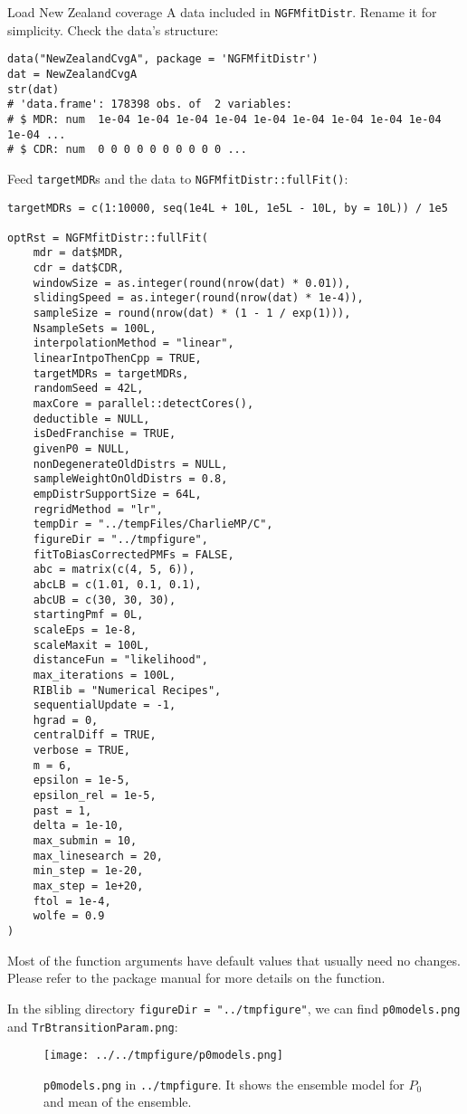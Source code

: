 \documentclass[12pt,letterpaper]{article}
\begin{document}
Load New Zealand coverage A data included in \texttt{NGFMfitDistr}. Rename it for simplicity. Check the data's structure:
\begin{verbatim}
data("NewZealandCvgA", package = 'NGFMfitDistr')
dat = NewZealandCvgA
str(dat)
# 'data.frame':	178398 obs. of  2 variables:
# $ MDR: num  1e-04 1e-04 1e-04 1e-04 1e-04 1e-04 1e-04 1e-04 1e-04 1e-04 ...
# $ CDR: num  0 0 0 0 0 0 0 0 0 0 ...
\end{verbatim}
Feed \texttt{targetMDR}s and the data to \texttt{NGFMfitDistr::fullFit()}:
\begin{verbatim}
targetMDRs = c(1:10000, seq(1e4L + 10L, 1e5L - 10L, by = 10L)) / 1e5

optRst = NGFMfitDistr::fullFit(
	mdr = dat$MDR,
	cdr = dat$CDR,
	windowSize = as.integer(round(nrow(dat) * 0.01)),
	slidingSpeed = as.integer(round(nrow(dat) * 1e-4)),
	sampleSize = round(nrow(dat) * (1 - 1 / exp(1))),
	NsampleSets = 100L,
	interpolationMethod = "linear",
	linearIntpoThenCpp = TRUE,
	targetMDRs = targetMDRs,
	randomSeed = 42L,
	maxCore = parallel::detectCores(),
	deductible = NULL,
	isDedFranchise = TRUE,
	givenP0 = NULL,
	nonDegenerateOldDistrs = NULL,
	sampleWeightOnOldDistrs = 0.8,
	empDistrSupportSize = 64L,
	regridMethod = "lr",
	tempDir = "../tempFiles/CharlieMP/C",
	figureDir = "../tmpfigure",
	fitToBiasCorrectedPMFs = FALSE,
	abc = matrix(c(4, 5, 6)),
	abcLB = c(1.01, 0.1, 0.1),
	abcUB = c(30, 30, 30),
	startingPmf = 0L,
	scaleEps = 1e-8,
	scaleMaxit = 100L,
	distanceFun = "likelihood",
	max_iterations = 100L,
	RIBlib = "Numerical Recipes",
	sequentialUpdate = -1,
	hgrad = 0,
	centralDiff = TRUE,
	verbose = TRUE,
	m = 6,
	epsilon = 1e-5,
	epsilon_rel = 1e-5,
	past = 1,
	delta = 1e-10,
	max_submin = 10,
	max_linesearch = 20,
	min_step = 1e-20,
	max_step = 1e+20,
	ftol = 1e-4,
	wolfe = 0.9
)
\end{verbatim}
Most of the function arguments have default values that usually need no changes. Please refer to the package manual for more details on the function.

In the sibling directory \texttt{figureDir = "../tmpfigure"}, we can find \texttt{p0models.png} and \texttt{TrBtransitionParam.png}:
\begin{figure}[h!] 
\texttt{[image: ../../tmpfigure/p0models.png]}
\caption{\texttt{p0models.png} in \texttt{../tmpfigure}. It shows the ensemble model for $P_0$ and mean of the ensemble.} 
\end{figure}
\end{document}
